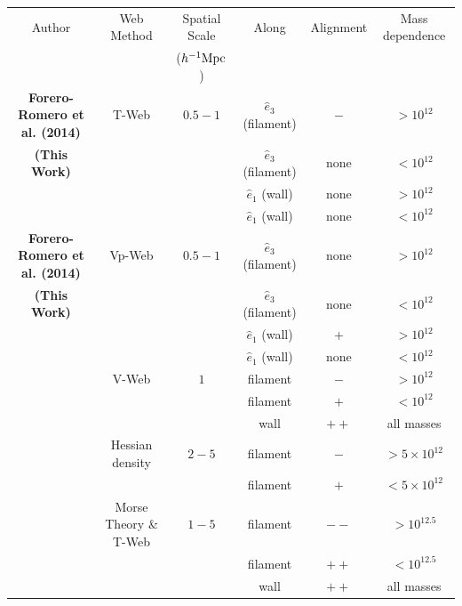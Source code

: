 \documentclass[useAMS,usenatbib]{mn2e}
\newcommand{\hMpc}{{\ifmmode{h^{-1}{\rm Mpc}}\else{$h^{-1}$Mpc }\fi}}
\newcommand{\hMsun}{{\ifmmode{h^{-1}{\rm
        {M_{\odot}}}}\else{$h^{-1}{\rm{M_{\odot}}}$~}\fi}}
\begin{document}
\begin{table}
\begin{tabular}{cccccc}\hline\hline
Author & Web Method & Spatial Scale& Along &
Alignment & Mass dependence\\
 & & ($\hMpc$)& & & \\\hline

{\bf Forero-Romero et al. (2014)} & T-Web & $0.5-1$ &
$\hat{e}_3$  (filament) & $-$ & $>10^{12}$\hMsun\\

{\bf (This Work)}&   & &
$\hat{e}_3$  (filament) & none & $<10^{12}$\hMsun\\

&   & &
$\hat{e}_1$ (wall) & none & $>10^{12}$\hMsun\\

&   & &
$\hat{e}_1$ (wall) & none & $<10^{12}$\hMsun\\\hline

{\bf Forero-Romero et al. (2014)} & Vp-Web & $0.5-1$ &
$\hat{e}_3$  (filament) & none & $>10^{12}$\hMsun\\

{\bf (This Work)}&   & &
$\hat{e}_3$ (filament) & none & $<10^{12}$\hMsun\\

&   & &
$\hat{e}_1$ (wall) & + & $>10^{12}$\hMsun\\

&   & &
$\hat{e}_1$ (wall) & none & $<10^{12}$\hMsun\\\hline

\cite{Libeskind2013} & V-Web & $1$ &
filament &$-$ & $>10^{12}$\hMsun\\

&   & &
filament &$+$ & $<10^{12}$\hMsun\\

&   & &
wall & $++$ & all masses\\\hline

\cite{Trowland2013} & Hessian density & $2-5$ &
filament & $-$ & $> 5\times 10^{12}$\hMsun\\
&   & &
filament & $+$ & $< 5\times 10^{12}$\hMsun\\\hline

\cite{Codis2012} & Morse Theory \& T-Web & $1-5$ &
filament & $--$ & $>10^{12.5}$\hMsun \\

&   & &
filament & $++$ & $<10^{12.5}$\hMsun \\

& & &
wall & $++$ & all masses\\\hline


\end{tabular}
\end{table}
\end{document}
